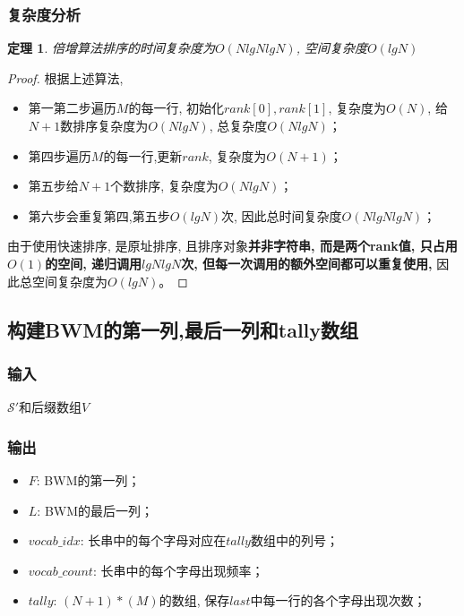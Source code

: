 \documentclass[UTF8]{ctexart}
\newtheorem{theory}{定理}
\begin{document}
    \subsubsection{复杂度分析}
    \begin{theory}
        倍增算法排序的时间复杂度为$O(NlgNlgN)$, 空间复杂度$O(lgN)$
    \end{theory}
    \begin{proof}
        根据上述算法,
        \begin{itemize}
            \item 第一第二步遍历$M$的每一行, 初始化$rank[0],rank[1]$, 复杂度为$O(N)$, 给$N+1$数排序复杂度为$O(NlgN)$, 总复杂度$O(NlgN)$；
            \item 第四步遍历$M$的每一行,更新$rank$, 复杂度为$O(N+1)$；
            \item 第五步给$N+1$个数排序, 复杂度为$O(NlgN)$；
            \item 第六步会重复第四,第五步$O(lgN)$次, 因此总时间复杂度$O(NlgNlgN)$；
        \end{itemize}
        由于使用快速排序, 是原址排序, 且排序对象\textbf{并非字符串, 而是两个rank值, 只占用$O(1)$的空间, 递归调用$lgNlgN$次, 但每一次调用的额外空间都可以重复使用, }因此总空间复杂度为$O(lgN)$。
    \end{proof}
    \subsection{构建BWM的第一列,最后一列和tally数组}
    \subsubsection{输入}
    $\mathcal{S}'$和后缀数组$V$
    \subsubsection{输出}
    \begin{itemize}
        \item $F$: BWM的第一列；
        \item $L$: BWM的最后一列；
        \item $vocab\_idx$: 长串中的每个字母对应在$tally$数组中的列号；
        \item $vocab\_count$: 长串中的每个字母出现频率；
        \item $tally$: $(N+1) * (M)$的数组, 保存$last$中每一行的各个字母出现次数；
    \end{itemize}
\end{document}
